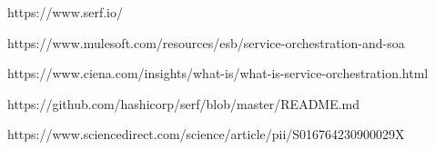 \documentclass[12pt, oneside]{article}
\begin{document}
\newpage

\begin{thebibliography}{9}
https://www.serf.io/

https://www.mulesoft.com/resources/esb/service-orchestration-and-soa

https://www.ciena.com/insights/what-is/what-is-service-orchestration.html

https://github.com/hashicorp/serf/blob/master/README.md

https://www.sciencedirect.com/science/article/pii/S016764230900029X

\end{thebibliography}	
	
\end{document}
